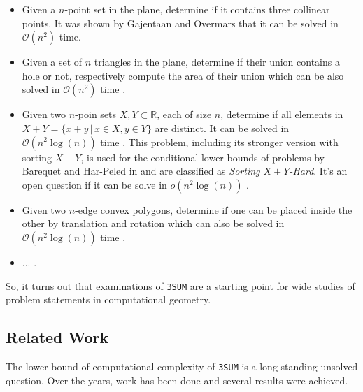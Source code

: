 \begin{itemize}
    \item Given a $n$-point set in the plane, determine if it contains three collinear points. It was shown by Gajentaan and Overmars \cite{gajentaan1995class} that it can be solved in $\mathcal{O}\left(n^{2}\right)$ time.
    \item Given a set of $n$ triangles in the plane, determine if their union contains a hole or not, respectively compute the area of their union which can be also solved in $\mathcal{O}\left(n^{2}\right)$ time \cite{gajentaan1995class}.
    \item Given two $n$-poin sets $X, Y \subset \mathbb{R}$, each of size $n$, determine if all elements in $X + Y = \{x + y \, | \, x \in X, y \in Y\}$ are distinct. It can be solved in $\mathcal{O}\left(n^{2}\log\left(n\right)\right)$ time \cite{barequet2001polygon}. This problem, including its stronger version with sorting $X + Y$, is used for the conditional lower bounds of problems by Barequet and Har-Peled in \cite{barequet2001polygon} and are classified as \textit{Sorting $X + Y$-Hard}. It's an open question if it can be solve in $o\left(n^{2}\log\left(n\right)\right)$ \cite{TheOpenP60:online} \cite{TheOpenP60:onlineP11} \cite{TheOpenP60:onlineP41}.    
    \item Given two $n$-edge convex polygons, determine if one can be placed inside the other by translation and rotation which can also be solved in $\mathcal{O}\left(n^{2}\log\left(n\right)\right)$ time \cite{barequet2001polygon}.
    \item ... .
\label{it:3sumhardnessproblems}
\end{itemize}

So, it turns out that examinations of \texttt{3SUM} are a starting point for wide studies of problem statements in computational geometry.
\subsection{Related Work}
\label{ss:relatedwork}
The lower bound of computational complexity of \texttt{3SUM} is a long standing unsolved question. Over the years, work has been done and several results were achieved.


